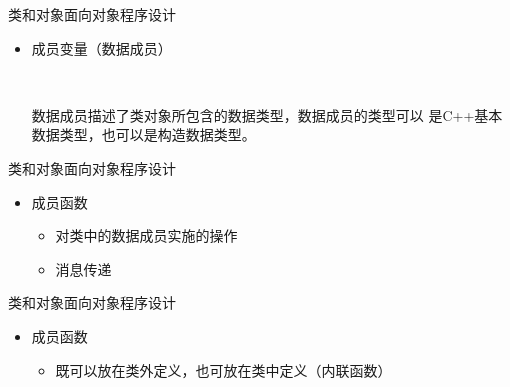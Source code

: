\begin{frame}[t, fragile]{类和对象}{面向对象程序设计}%
  \begin{itemize}
  \item 成员变量（数据成员）\\    
    \centering
    \vspace{2ex}
    \begin{minipage}{0.35\linewidth}
    \end{minipage}\quad
    \begin{minipage}{0.57\linewidth}
    \end{minipage}\\
    \begin{minipage}{0.75\linewidth}
      \small
      数据成员描述了类对象所包含的数据类型，数据成员的类型可以
      是C++\alert{基本数据类型}，也可以是\alert{构造数据类型}。
    \end{minipage}
  \end{itemize}  
\end{frame}

\begin{frame}[t, fragile]{类和对象}{面向对象程序设计}%
  \begin{itemize}
  \item 成员函数
    \begin{itemize}
    \item 对类中的数据成员实施的操作
    \item 消息传递
    \end{itemize}
    \centering
    \vspace{2ex}
    \begin{minipage}{0.7\linewidth}
    \end{minipage}
  \end{itemize}  
\end{frame}

\begin{frame}[t, fragile]{类和对象}{面向对象程序设计}%
  \begin{itemize}
  \item 成员函数
    \begin{itemize}
    \item 既可以放在类外定义，也可放在类中定义（\alert{内联函数}）
    \end{itemize}
    \centering
    \vspace{2ex}
    \begin{minipage}{0.6\linewidth}
    \end{minipage}
  \end{itemize}  
\end{frame}

